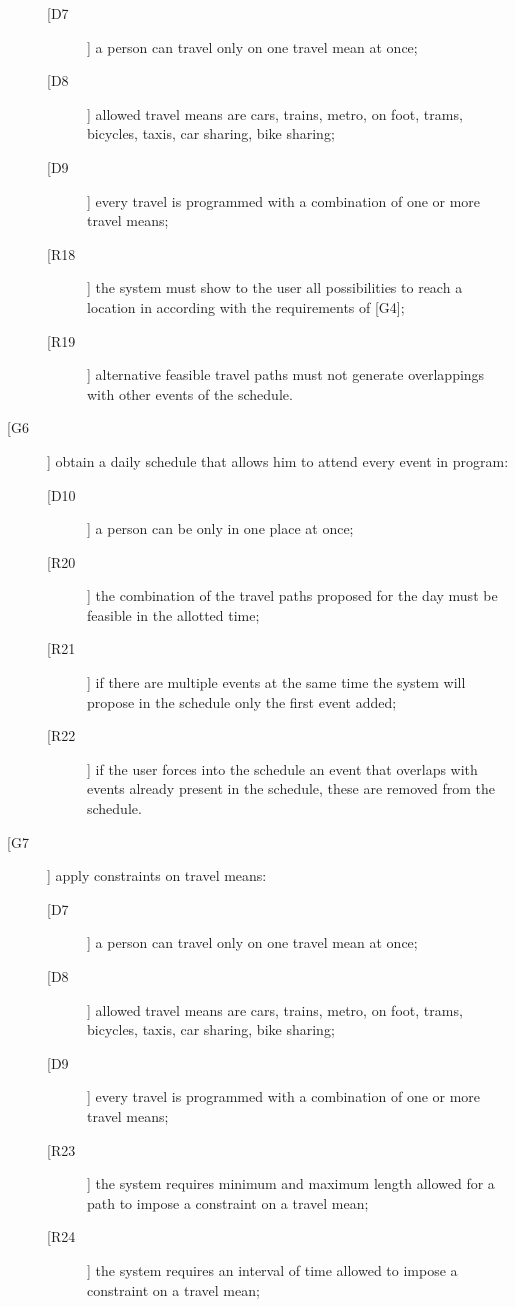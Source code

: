 \begin{description}
	\begin{description}
	\item[[D7]] a person can travel only on one travel mean at once; 
	\item[[D8]] allowed travel means are cars, trains, metro, on foot, trams, bicycles, taxis, car sharing, bike sharing;
	\item[[D9]] every travel is programmed with a combination of one or more travel means;
	\newline
	\item[[R18]] the system must show to the user all possibilities to reach a location in according with the requirements of [G4];
	\item[[R19]] alternative feasible travel paths must not generate overlappings with other events of the schedule.
	\end{description}
\item[[G6]] obtain a daily schedule that allows him to attend every event in program:
	\begin{description}
	\item[[D10]] a person can be only in one place at once;
	\newline
	\item[[R20]] the combination of the travel paths proposed for the day must be feasible in the allotted time;
	\item[[R21]] if there are multiple events at the same time the system will propose in the schedule only the first event added;
	\item[[R22]] if the user forces into the schedule an event that overlaps with events already present in the schedule, these are removed from the schedule.
	\end{description}
\item[[G7]] apply constraints on travel means:
	\begin{description}
	\item[[D7]] a person can travel only on one travel mean at once; 
	\item[[D8]] allowed travel means are cars, trains, metro, on foot, trams, bicycles, taxis, car sharing, bike sharing;	
	\item[[D9]] every travel is programmed with a combination of one or more travel means;
	\newline
	\item[[R23]] the system requires minimum and maximum length allowed for a path to impose a constraint on a travel mean;
	\item[[R24]] the system requires an interval of time allowed to impose a constraint on a travel mean;

\end{description}
\end{description}
